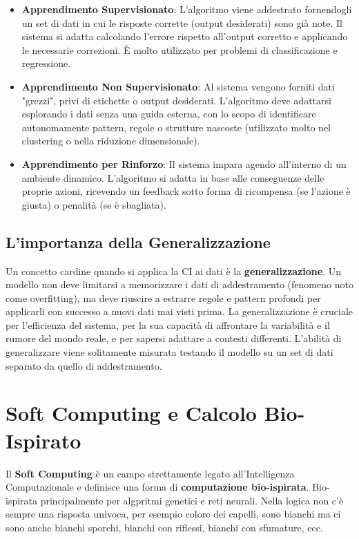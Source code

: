 \begin{itemize}
    \item \textbf{Apprendimento Supervisionato}: L'algoritmo viene addestrato fornendogli 
    un set di dati in cui le risposte corrette (output desiderati) sono già note. 
    Il sistema si adatta calcolando l'errore rispetto all'output corretto e applicando 
    le necessarie correzioni. È molto utilizzato per problemi di classificazione e 
    regressione.
    \item \textbf{Apprendimento Non Supervisionato}: Al sistema vengono forniti dati 
    "grezzi", privi di etichette o output desiderati. L'algoritmo deve adattarsi 
    esplorando i dati senza una guida esterna, con lo scopo di identificare 
    autonomamente pattern, regole o strutture nascoste (utilizzato molto nel 
    clustering o nella riduzione dimensionale).
    \item \textbf{Apprendimento per Rinforzo}: Il sistema impara agendo all'interno 
    di un ambiente dinamico. L'algoritmo si adatta in base alle conseguenze delle 
    proprie azioni, ricevendo un feedback sotto forma di ricompensa (se l'azione è 
    giusta) o penalità (se è sbagliata).
\end{itemize}

\subsection{L'importanza della Generalizzazione}
Un concetto cardine quando si applica la CI ai dati è la \textbf{generalizzazione}. 
Un modello non deve limitarsi a memorizzare i dati di addestramento 
(fenomeno noto come overfitting), ma deve riuscire a estrarre regole e pattern 
profondi per applicarli con successo a nuovi dati mai visti prima. 
La generalizzazione è cruciale per l'efficienza del sistema, per la sua capacità 
di affrontare la variabilità e il rumore del mondo reale, e per sapersi adattare 
a contesti differenti. L'abilità di generalizzare viene solitamente misurata 
testando il modello su un set di dati separato da quello di addestramento.\\

\section{Soft Computing e Calcolo Bio-Ispirato}
Il \textbf{Soft Computing} è un campo strettamente legato all'Intelligenza 
Computazionale e definisce una forma di \textbf{computazione bio-ispirata}. 
Bio-ispirata principalmente per algpritmi genetici e reti neurali. 
Nella logica non c'è sempre una risposta univoca, per esempio colore dei capelli, sono
bianchi ma ci sono anche bianchi sporchi, bianchi con riflessi, bianchi con sfumature, ecc.

